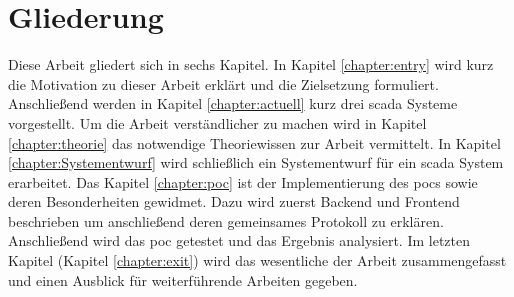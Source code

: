 \section{Gliederung}
Diese Arbeit gliedert sich in sechs Kapitel. In Kapitel \ref{chapter:entry} wird kurz die Motivation zu dieser Arbeit erklärt und die Zielsetzung formuliert.
Anschließend werden in Kapitel \ref{chapter:actuell} kurz drei \ac{scada} Systeme vorgestellt. 
Um die Arbeit verständlicher zu machen wird in Kapitel \ref{chapter:theorie} das notwendige Theoriewissen zur Arbeit vermittelt.
In Kapitel \ref{chapter:Systementwurf} wird schließlich ein Systementwurf für ein \ac{scada} System erarbeitet.
Das Kapitel \ref{chapter:poc} ist der Implementierung des \acp{poc} sowie deren Besonderheiten gewidmet.
Dazu wird zuerst Backend und Frontend beschrieben um anschließend deren gemeinsames Protokoll zu erklären.
Anschließend wird das \ac{poc} getestet und das Ergebnis analysiert. 
Im letzten Kapitel (Kapitel \ref{chapter:exit}) wird das wesentliche der Arbeit zusammengefasst und einen Ausblick für weiterführende Arbeiten gegeben.
